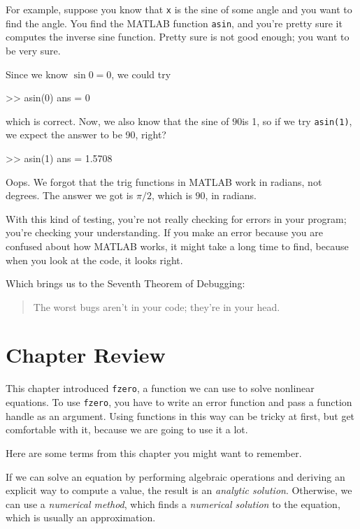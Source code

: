 
For example, suppose you know that \lstinline{x} is the sine of some
angle and you want to find the angle.  You find the MATLAB function
\lstinline{asin}, and you're pretty sure it computes the inverse sine
function.  Pretty sure is not good enough; you want to be very sure.

Since we know $\sin 0 = 0$, we could try

\begin{code}
>> asin(0)
ans = 0
\end{code}
which is correct.  Now, we also know that the sine of $90$\textdegree is
1, so if we try \lstinline{asin(1)}, we expect the answer to be 90, right?

\begin{code}
>> asin(1)
ans = 1.5708
\end{code}

Oops.  We forgot that the trig functions in MATLAB work in radians,
not degrees.  The answer we got is $\pi/2$, which is $90$\textdegree, in radians.

With this kind of testing, you're not really checking for
errors in your program; you're checking your understanding.  If you
make an error because you are confused about how MATLAB works, it
might take a long time to find, because when you look at the code,
it looks right.


Which brings us to the Seventh Theorem of Debugging:

\begin{quote}
The worst bugs aren't in your code; they're in your head.
\end{quote}

\section{Chapter Review}

This chapter introduced \lstinline{fzero}, a function we can use to solve nonlinear equations.
To use \lstinline{fzero}, you have to write an error function and pass a function handle as an argument.  Using functions in this way can be tricky at first, but get comfortable with it, because we are going to use it a lot.

Here are some terms from this chapter you might want to remember.

If we can solve an equation by performing algebraic operations and deriving an explicit way to compute a value, the result is an \emph{analytic solution}.
Otherwise, we can use a \emph{numerical method}, which finds a \emph{numerical solution} to the equation, which is usually an approximation.


